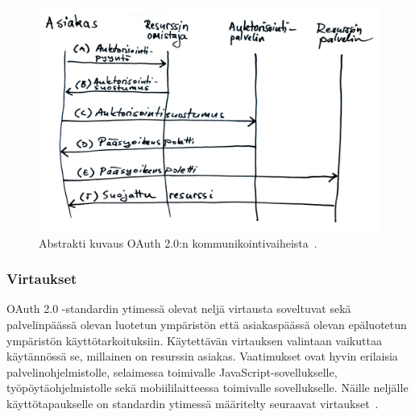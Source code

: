 \documentclass[finnish,gradu]{tktltiki}
\begin{document}
  \begin{figure}[h!]
    \centering
    \includegraphics[width=1.0\textwidth]{images/oauth_abstract_flow.jpg}
    \caption{Abstrakti kuvaus OAuth 2.0:n kommunikointivaiheista~\cite{ietf_oauth2}.}
    \label{fig:oauth_abstract_flow}
  \end{figure}



  \subsubsection{Virtaukset} %
  \label{ssub:oauth_virtaukset}

  OAuth 2.0 -standardin ytimessä olevat neljä virtausta soveltuvat sekä palvelinpäässä olevan luotetun ympäristön että asiakaspäässä olevan epäluotetun ympäristön käyttötarkoituksiin. Käytettävän virtauksen valintaan vaikuttaa käytännössä se, millainen on resurssin asiakas. Vaatimukset ovat hyvin erilaisia palvelinohjelmistolle, selaimessa toimivalle JavaScript-sovellukselle, työpöytäohjelmistolle sekä mobiililaitteessa toimivalle sovellukselle. Näille neljälle käyttötapaukselle on standardin ytimessä määritelty seuraavat virtaukset~\cite{ietf_oauth2}.
\end{document}
